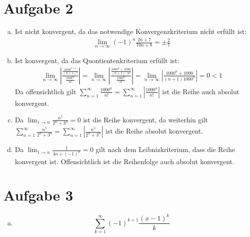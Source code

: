 \documentclass[10pt,a4paper,parskip=half]{scrartcl}
\begin{document}
\section*{Aufgabe 2}
\begin{enumerate}[a)]
	\item 
	Ist nicht konvergent, da das notwendige Konvergenzkriterium nicht erfüllt ist:
		\begin{align*} 
			\lim_{n \to \infty} (-1)^n\frac{2n+7}{70n + 8} = \pm \frac 27 
		\end{align*}
         \item 
         Ist konvergent, da das Quontientenkriterium erfüllt ist:
            \begin{align*} 
               \lim_{n \to \infty} \left|\frac{\frac{1000^{n+1}}{(n+1)!}}{\frac{1000^n}{n!}}\right| = \lim_{n \to \infty} \left|\frac{\frac{1000^{n} + 1000}{(n+1) \cdot n!}}{\frac{1000^n}{n!}}\right| = \lim_{n \to \infty} \left|\frac{1000^{n} + 1000}{(n+1) 1000^n}\right| = 0 < 1
            \end{align*}
         Da offensichtlich gilt $\sum_{n=1}^{\infty}\frac{1000^n}{n!} =  \sum_{n=1}^{\infty}\left|\frac{1000^n}{n!}\right|$  ist die Reihe auch absolut konvergent.
         \item 
         Da $\lim_{1 \to n} \frac{n^5}{2^n+3^n} = 0$ ist die Reihe konvergent, da weiterhin gilt $\sum_{n=1}^{\infty}\frac{n^5}{2^n+3^n}  =  \sum_{n=1}^{\infty}\left|\frac{n^5}{2^n+3^n}\right|$ ist die Reihe absolut konvergent.
         \item 
         Da $\lim_{1 \to n} \frac{1}{4n + (-1)^n} = 0$ gilt nach dem Leibnizkriterium, dass die Reihe konvergent ist. Offensichtlich ist die Reihenfolge auch absolut konvergent.


\end{enumerate}
\section*{Aufgabe 3}
\begin{enumerate}[a)]
	\item 
		\[ \sum_{k=1}^{\infty}(-1)^{k+1}\frac{(x-1)^k}{k} \]
\end{enumerate}
\end{document}
